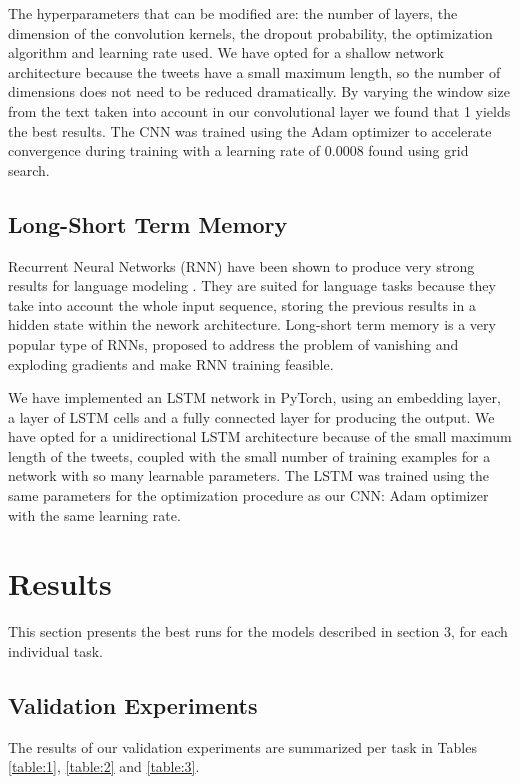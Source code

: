 \documentclass[11pt,a4paper]{article}
\begin{document}
The hyperparameters that can be modified are: the number of layers, the dimension of the convolution kernels, the dropout probability, the optimization algorithm and learning rate used. We have opted for a shallow network architecture because the tweets have a small maximum length, so the number of dimensions does not need to be reduced dramatically. By varying the window size from the text taken into account in our convolutional layer we found that 1 yields the best results. The CNN was trained using the Adam optimizer \cite{adam} to accelerate convergence during training with a learning rate of 0.0008 found using grid search.

\subsection{Long-Short Term Memory}

Recurrent Neural Networks (RNN) have been shown to produce very strong results for language modeling \cite{model}. 
They are suited for language tasks because they take into account the whole input sequence, storing the previous results in a hidden state within the nework architecture. Long-short term memory \cite{lstm} is a very popular type of RNNs, proposed to address the problem of vanishing and exploding gradients and make RNN training feasible.

We have implemented an LSTM network in PyTorch, using an embedding layer, a layer of LSTM cells and a fully connected layer for producing the output. We have opted for a unidirectional LSTM architecture because of the small maximum length of the tweets, coupled with the small number of training examples for a network with so many learnable parameters. The LSTM was trained using the same parameters for the optimization procedure as our CNN: Adam optimizer with the same learning rate.

\section{Results}

This section presents the best runs for the models described in section 3, for each individual task.

\subsection{Validation Experiments}

The results of our validation experiments are summarized per task in Tables \ref{table:1}, \ref{table:2} and \ref{table:3}.
\end{document}
